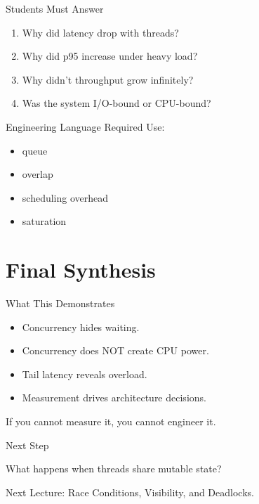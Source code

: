 \documentclass[11pt]{beamer}
\begin{document}
	\begin{frame}{Students Must Answer}
		
		\begin{enumerate}
			\item Why did latency drop with threads?
			\item Why did p95 increase under heavy load?
			\item Why didn’t throughput grow infinitely?
			\item Was the system I/O-bound or CPU-bound?
		\end{enumerate}

		
		\begin{block}{Engineering Language Required}
			Use:
			\begin{itemize}
				\item queue
				\item overlap
				\item scheduling overhead
				\item saturation
			\end{itemize}
		\end{block}
	\end{frame}
	
	\section{Final Synthesis}
	
	\begin{frame}{What This Demonstrates}
		
		\begin{itemize}
			\item Concurrency hides waiting.
			\item Concurrency does NOT create CPU power.
			\item Tail latency reveals overload.
			\item Measurement drives architecture decisions.
		\end{itemize}

		
		\begin{alertblock}
			If you cannot measure it,  
			you cannot engineer it.
		\end{alertblock}
	\end{frame}
	
	\begin{frame}{Next Step}
		
		\Large
		What happens when threads share mutable state?

		
		\begin{alertblock}
			Next Lecture: Race Conditions, Visibility, and Deadlocks.
		\end{alertblock}
		
	\end{frame}
	
\end{document}
